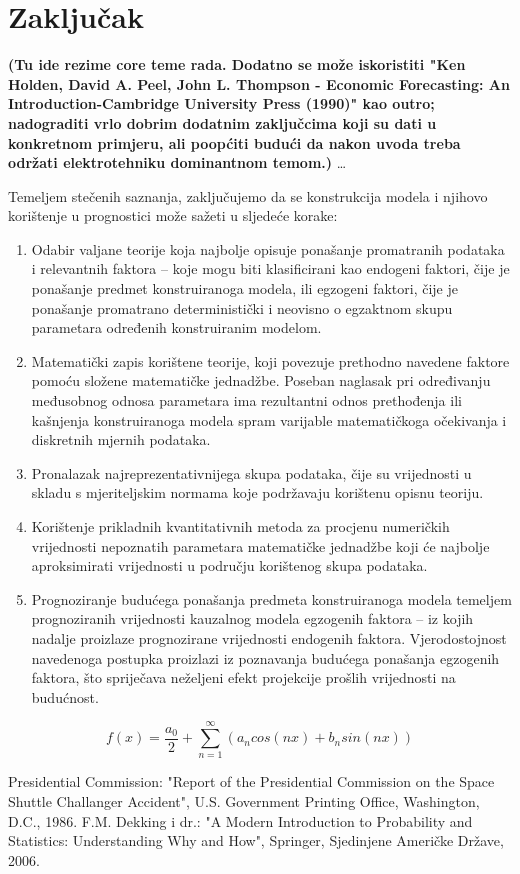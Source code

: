 \documentclass[a4paper,12pt,oneside]{memoir}
\newcommand{\fourierovred}{f(x)= \frac{a_0}{2}+\sum_{n=1}^\infty (a_n cos(nx)+b_n sin(nx))}
\begin{document}
    \chapter{Zaključak}
        \textbf{(Tu ide rezime core teme rada. Dodatno se može iskoristiti "Ken Holden, David A. Peel, John L. Thompson - Economic Forecasting: An Introduction-Cambridge University Press (1990)" kao outro; nadograditi vrlo dobrim dodatnim zaključcima koji su dati u konkretnom primjeru, ali poopćiti budući da nakon uvoda treba održati elektrotehniku dominantnom temom.)} %
        \ldots{}


        Temeljem stečenih saznanja, zaključujemo da se konstrukcija modela i njihovo korištenje u prognostici može sažeti u sljedeće korake:
        \begin{enumerate}
            \item Odabir valjane teorije koja najbolje opisuje ponašanje promatranih podataka i relevantnih faktora -- koje mogu biti klasificirani kao endogeni faktori, čije je ponašanje predmet konstruiranoga modela, ili egzogeni faktori, čije je ponašanje promatrano deterministički i neovisno o egzaktnom skupu parametara određenih konstruiranim modelom.
            \item Matematički zapis korištene teorije, koji povezuje prethodno navedene faktore pomoću složene matematičke jednadžbe. Poseban naglasak pri određivanju međusobnog odnosa parametara ima rezultantni odnos prethođenja ili kašnjenja konstruiranoga modela spram varijable matematičkoga očekivanja i diskretnih mjernih podataka.
            \item Pronalazak najreprezentativnijega skupa podataka, čije su vrijednosti u skladu s mjeriteljskim normama koje podržavaju korištenu opisnu teoriju.
            \item Korištenje prikladnih kvantitativnih metoda za procjenu numeričkih vrijednosti nepoznatih parametara matematičke jednadžbe koji će najbolje aproksimirati vrijednosti u području korištenog skupa podataka.
            \item Prognoziranje budućega ponašanja predmeta konstruiranoga modela temeljem prognoziranih vrijednosti kauzalnog modela egzogenih faktora -- iz kojih nadalje proizlaze prognozirane vrijednosti endogenih faktora. Vjerodostojnost navedenoga postupka proizlazi iz poznavanja budućega ponašanja egzogenih faktora, što spriječava neželjeni efekt projekcije prošlih vrijednosti na budućnost.
        \end{enumerate}
        $$\fourierovred$$
    \begin{thebibliography}{9}
         Presidential Commission: "Report of the Presidential Commission on the Space Shuttle Challanger Accident", U.S. Government Printing Office, Washington, D.C., 1986.
         F.M. Dekking i dr.: "A Modern Introduction to Probability and Statistics: Understanding Why and How", Springer, Sjedinjene Američke Države, 2006.
    \end{thebibliography}
\end{document}
